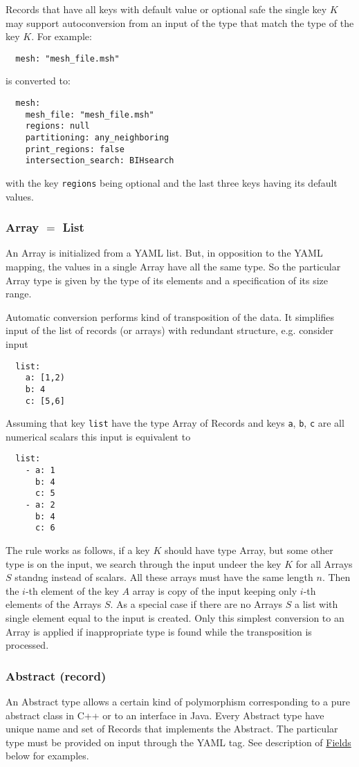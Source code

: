 Records that have all keys with default value or optional safe the single key $K$ may support autoconversion from an input of the type that match 
the type of the key $K$. For example:
\begin{verbatim}
  mesh: "mesh_file.msh"
\end{verbatim}
is converted to:
\begin{verbatim}
  mesh:
    mesh_file: "mesh_file.msh"
    regions: null
    partitioning: any_neighboring
    print_regions: false
    intersection_search: BIHsearch
\end{verbatim}
with the key \verb'regions' being optional and the last three keys having its default values. 


\subsubsection{Array $=$ List}
An Array is initialized from a YAML list. But, in opposition to the YAML mapping, the values in a single Array 
have all the same type. So the particular Array type is given by the type of its elements and a specification of its size range.

Automatic conversion performs kind of transposition of the data. It simplifies input of the list of records (or arrays) 
with redundant structure, e.g. consider input
\begin{verbatim}
  list:
    a: [1,2)
    b: 4
    c: [5,6]
\end{verbatim}
Assuming that key \verb'list' have the type Array of Records and keys \verb'a', \verb'b', \verb'c' are all numerical scalars this input is equivalent to
\begin{verbatim}
  list:
    - a: 1
      b: 4
      c: 5
    - a: 2
      b: 4
      c: 6
\end{verbatim}
The rule works as follows, if a key $K$ should have type Array, but some other type is on the input, 
we search through the input undeer the key $K$ for all Arrays $S$ standng instead of scalars.
All these arrays must have the same length $n$. Then the $i$-th element of the key $A$ array is
copy of the input keeping only $i$-th elements of the Arrays $S$.
As a special case if there are no Arrays $S$ a list with single element equal to the input is created.
Only this simplest conversion to an Array is applied if inappropriate type is found 
while the transposition is processed.





\subsubsection{Abstract (record)}
\label{sec:abstract}
An Abstract type allows a certain kind of polymorphism corresponding to a pure abstract class in C++ or to an interface in Java. 
Every Abstract type have unique name and set of Records that implements the Abstract. The particular type must be provided on input through the YAML tag.
See description of \hyperlink{sec:Fields}{Fields} below for examples.

